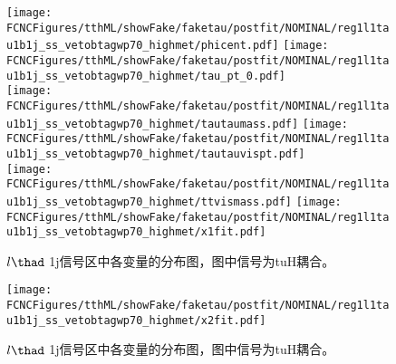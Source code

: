 \begin{figure}[H]
\centering
\texttt{[image: \\FCNCFigures/tthML/showFake/faketau/postfit/NOMINAL/reg1l1tau1b1j\_ss\_vetobtagwp70\_highmet/phicent.pdf]}
\texttt{[image: \\FCNCFigures/tthML/showFake/faketau/postfit/NOMINAL/reg1l1tau1b1j\_ss\_vetobtagwp70\_highmet/tau\_pt\_0.pdf]}
\\
\texttt{[image: \\FCNCFigures/tthML/showFake/faketau/postfit/NOMINAL/reg1l1tau1b1j\_ss\_vetobtagwp70\_highmet/tautaumass.pdf]}
\texttt{[image: \\FCNCFigures/tthML/showFake/faketau/postfit/NOMINAL/reg1l1tau1b1j\_ss\_vetobtagwp70\_highmet/tautauvispt.pdf]}
\\
\texttt{[image: \\FCNCFigures/tthML/showFake/faketau/postfit/NOMINAL/reg1l1tau1b1j\_ss\_vetobtagwp70\_highmet/ttvismass.pdf]}
\texttt{[image: \\FCNCFigures/tthML/showFake/faketau/postfit/NOMINAL/reg1l1tau1b1j\_ss\_vetobtagwp70\_highmet/x1fit.pdf]}
\\
\caption{$l\thad$ 1j信号区中各变量的分布图，图中信号为tuH耦合。}
\label{fig:var_reg1l1tau1b1j_ss_vetobtagwp70_highmet_3}
\end{figure}
\begin{figure}[H]
\centering
\texttt{[image: \\FCNCFigures/tthML/showFake/faketau/postfit/NOMINAL/reg1l1tau1b1j\_ss\_vetobtagwp70\_highmet/x2fit.pdf]}
\caption{$l\thad$ 1j信号区中各变量的分布图，图中信号为tuH耦合。}
\label{fig:var_reg1l1tau1b1j_ss_vetobtagwp70_highmet}
\end{figure}
